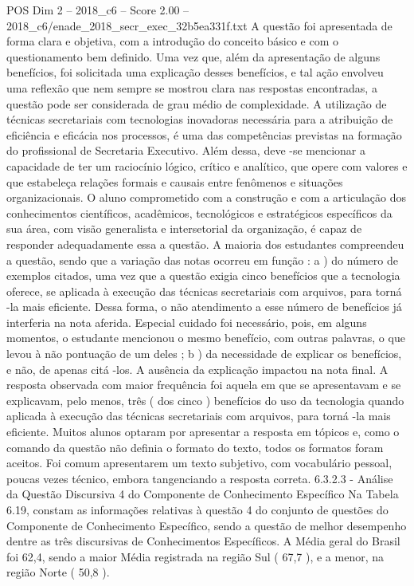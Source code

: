 \begin{textsample}{POS Dim 2 – 2018\_c6 – Score 2.00 – 2018\_c6/enade\_2018\_secr\_exec\_32b5ea331f.txt}
A questão foi apresentada de forma clara e objetiva, com a introdução do conceito básico e com o questionamento bem definido.
Uma vez que, além da apresentação de alguns benefícios, foi solicitada uma explicação desses benefícios, e tal ação envolveu uma reflexão que nem sempre se mostrou clara nas respostas encontradas, a questão pode ser considerada de grau médio de complexidade.
A utilização de técnicas secretariais com tecnologias inovadoras necessária para a atribuição de eficiência e eficácia nos processos, é uma das competências previstas na formação do profissional de Secretaria Executivo.
Além dessa, deve -se mencionar a capacidade de ter um raciocínio lógico, crítico e analítico, que opere com valores e que estabeleça relações formais e causais entre fenômenos e situações organizacionais.
O aluno comprometido com a construção e com a articulação dos conhecimentos científicos, acadêmicos, tecnológicos e estratégicos específicos da sua área, com visão generalista e intersetorial da organização, é capaz de responder adequadamente essa a questão.
A maioria dos estudantes compreendeu a questão, sendo que a variação das notas ocorreu em função : a ) do número de exemplos citados, uma vez que a questão exigia cinco benefícios que a tecnologia oferece, se aplicada à execução das técnicas secretariais com arquivos, para torná -la mais eficiente.
Dessa forma, o não atendimento a esse número de benefícios já interferia na nota aferida.
Especial cuidado foi necessário, pois, em alguns momentos, o estudante mencionou o mesmo benefício, com outras palavras, o que levou à não pontuação de um deles ; b ) da necessidade de explicar os benefícios, e não, de apenas citá -los.
A ausência da explicação impactou na nota final.
A resposta observada com maior frequência foi aquela em que se apresentavam e se explicavam, pelo menos, três ( dos cinco ) benefícios do uso da tecnologia quando aplicada à execução das técnicas secretariais com arquivos, para torná -la mais eficiente.
Muitos alunos optaram por apresentar a resposta em tópicos e, como o comando da questão não definia o formato do texto, todos os formatos foram aceitos.
Foi comum apresentarem um texto subjetivo, com vocabulário pessoal, poucas vezes técnico, embora tangenciando a resposta correta. 6.3.2.3 - Análise da Questão Discursiva 4 do Componente de Conhecimento Específico Na Tabela 6.19, constam as informações relativas à questão 4 do conjunto de questões do Componente de Conhecimento Específico, sendo a questão de melhor desempenho dentre as três discursivas de Conhecimentos Específicos.
A Média geral do Brasil foi 62,4, sendo a maior Média registrada na região Sul ( 67,7 ), e a menor, na região Norte ( 50,8 ).

\end{textsample}
